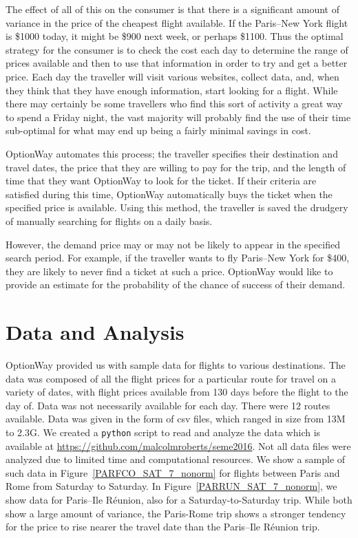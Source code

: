 \documentclass{article}
\begin{document}
The effect of all of this on the consumer is that there is a
significant amount of variance in the price of the cheapest flight
available.  If the Paris--New York flight is \$1000 today, it might be
\$900 next week, or perhaps \$1100.  Thus the optimal strategy for the
consumer is to check the cost each day to determine the range of
prices available and then to use that information in order to try and
get a better price.  Each day the traveller will visit various
websites, collect data, and, when they think that they have enough
information, start looking for a flight.  While there may certainly be
some travellers who find this sort of activity a great way to spend a
Friday night, the vast majority will probably find the use of their
time sub-optimal for what may end up being a fairly minimal savings in
cost.

OptionWay automates this process; the traveller specifies their
destination and travel dates, the price that they are willing to pay
for the trip, and the length of time that they want OptionWay to look
for the ticket.  If their criteria are satisfied during this time,
OptionWay automatically buys the ticket when the specified price is
available.  Using this method, the traveller is saved the drudgery of
manually searching for flights on a daily basis.

However, the demand price may or may not be likely to appear in the
specified search period.  For example, if the traveller wants to fly
Paris--New York for \$400, they are likely to never find a ticket at
such a price.  OptionWay would like to provide an estimate for the
probability of the chance of success of their demand.

\section{Data and Analysis}

OptionWay provided us with sample data for flights to various
destinations.  The data was composed of all the flight prices for a
particular route for travel on a variety of dates, with flight prices
available from 130 days before the flight to the day of.  Data was not
necessarily available for each day.  There were 12 routes available.
Data was given in the form of csv files, which ranged in size from 13M
to 2.3G.  We created a \texttt{python} script to read and analyze the
data which is available at
\url{https://github.com/malcolmroberts/seme2016}.  Not all data files
were analyzed due to limited time and computational resources.  We
show a sample of such data in Figure~\ref{PARFCO_SAT_7_nonorm} for
flights between Paris and Rome from Saturday to Saturday.  In
Figure~\ref{PARRUN_SAT_7_nonorm}, we show data for Paris--Ile R\'eunion,
also for a Saturday-to-Saturday trip.  While both show a large amount
of variance, the Paris-Rome trip shows a stronger tendency for the
price to rise nearer the travel date than the Paris--Ile R\'eunion trip.
\end{document}
